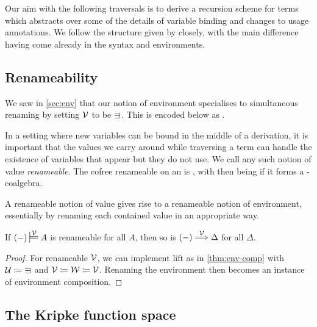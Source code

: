 Our aim with the following traversals is to derive a recursion scheme for
terms which abstracts over some of the details of variable binding and
changes to usage annotations.
We follow the structure given by \citet{AACMM21} closely, with
the main difference having come already in the syntax and environments.

\subsection{Renameability}

We saw in \cref{sec:env} that our notion of environment specialises to
simultaneous renaming by setting $\mathcal V$ to be $\sqni$.
This is encoded below as
.


In a setting where new variables can be bound in the middle of a derivation,
it is important that the values we carry around while traversing a term can
handle the existence of variables that appear but they do not use.
We call any such notion of value \emph{renameable}.
The cofree renameable  on an 
 is \AgdaSpace{}, with
 then being  if it forms a
-coalgebra.


A renameable notion of value gives rise to a renameable notion of environment,
essentially by renaming each contained value in an appropriate way.

\begin{lemma}\label{thm:env-ren}
  If $\plr{-} \sdtstile{}\V A$ is renameable for all $A$, then so is
  $\plr{-} \env\V \Delta$ for all $\Delta$.
\end{lemma}
\begin{proof}
  For renameable $\mathcal V$, we can implement $\mathrm{lift}$ as in
  \cref{thm:env-comp} with $\U \coloneqq {\sqni}$ and
  $\mathcal V \coloneqq \mathcal W \coloneqq \mathcal V$.
  Renaming the environment then becomes an instance of environment composition.
\end{proof}

\subsection{The Kripke function space}

